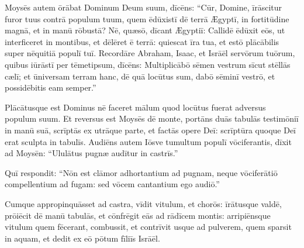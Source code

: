 Moysēs autem ōrābat Dominum Deum suum, dīcēns: ``Cūr, Domine, īrāscitur furor tuus contrā
populum tuum, quem ēdūxistī dē terrā Ægyptī, in fortitūdine magnā, et in manū
rōbustā? 
Nē, quæsō, dīcant Ægyptiī: 
Callidē ēdūxit eōs,
ut interficeret in montibus, et dēlēret ē terrā: quiescat īra tua, et estō
plācābilis
super nēquitiā populī tuī. 
Recordāre Abraham, Isaac, et
Isrāēl servōrum tuōrum, quibus iūrāstī per tēmetipsum,
dīcēns: Multiplicābō sēmen
vestrum sīcut stēllās cælī; et ūniversam terram hanc, dē quā locūtus sum,
dabō sēminī vestrō, et possidēbitis eam semper.''

Plācātusque est Dominus
nē faceret mālum quod locūtus fuerat adversus populum suum. 
Et reversus
est Moysēs dē monte, portāns duās tabulās testimōniī in manū suā, scrīptās ex utrāque parte, 
et factās opere Deī: scrīptūra quoque Deī erat sculpta in
tabulīs. 
Audiēns autem Iōsve tumultum populī vōciferantis, dīxit ad Moysēn: ``Ululātus pugnæ audītur in
castrīs.'' 

Quī respondit: ``Nōn est clāmor adhortantium ad
pugnam, neque vōciferātiō compellentium ad
fugam: sed vōcem cantantium ego audiō.''

Cumque appropinquāsset ad
castra, vīdit vitulum, et chorōs: īrātusque valdē, prōiēcit dē
manū tabulās, et cōnfrēgit eās ad
rādīcem montis: 
arripiēnsque vitulum quem fēcerant, combussit,
et contrīvit usque
ad pulverem, quem sparsit
in aquam, et dedit ex eō pōtum fīliīs Isrāēl. 

